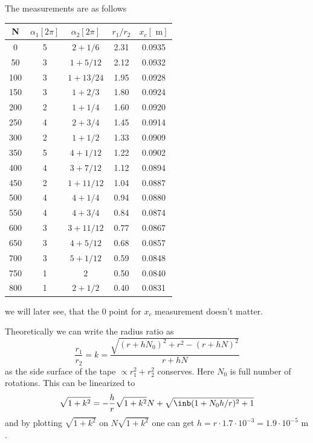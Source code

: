 \newcommand{\inlfrac}[2]{+#1/#2}
The measurements are as follows
\begin{center}
    \begin{tabular}{ c | c | c | c | c}
    N   & $\alpha_1 [2\pi]$ & $\alpha_2 [2\pi]$ & $r_1 / r_2$ & $x_c[\text{ m}]$\\
    \hline
    0   &   5       & $2\inlfrac{1}{6}   $ & 2.31 & 0.0935   \\
    50  &   3       & $1\inlfrac{5}{12}  $ & 2.12 & 0.0932   \\
    100 &   3       & $1\inlfrac{13}{24} $ & 1.95 & 0.0928   \\
    150 &   3       & $1\inlfrac{2}{3}   $ & 1.80 & 0.0924   \\
    200 &   2       & $1\inlfrac{1}{4}   $ & 1.60 & 0.0920   \\
    250 &   4       & $2\inlfrac{3}{4}   $ & 1.45 & 0.0914   \\
    300 &   2       & $1\inlfrac{1}{2}   $ & 1.33 & 0.0909   \\
    350 &   5       & $4\inlfrac{1}{12}  $ & 1.22 & 0.0902   \\
    400 &   4       & $3\inlfrac{7}{12}  $ & 1.12 & 0.0894   \\
    450 &   2       & $1\inlfrac{11}{12} $ & 1.04 & 0.0887   \\
    500 &   4       & $4\inlfrac{1}{4}   $ & 0.94 & 0.0880   \\
    550 &   4       & $4\inlfrac{3}{4}   $ & 0.84 & 0.0874   \\
    600 &   3       & $3\inlfrac{11}{12} $ & 0.77 & 0.0867   \\
    650 &   3       & $4\inlfrac{5}{12}  $ & 0.68 & 0.0857   \\
    700 &   3       & $5\inlfrac{1}{12}  $ & 0.59 & 0.0848   \\
    750 &   1       & $2               $ & 0.50 & 0.0840   \\
    800 &   1       & $2\inlfrac{1}{2}   $ & 0.40 & 0.0831   
    \end{tabular}
\end{center}
we will later see,
that the $0$ point for $x_c$ measurement doesn't matter.

Theoretically we can write the radius ratio as
\begin{equation}
    \frac{r_1}{r_2} = k = \frac{\sqrt{(r + h N_0)^2 + r^2 - (r + h N)^2}}{r + h N}
\end{equation}
as the side surface of the tape $\propto r_1^2 + r_2^2$ conserves.
Here $N_0$ is full number of rotations.
This can be linearized to
\begin{equation}
    \sqrt{1+k^2} = -\frac{h}{r} \sqrt{1+k^2} N + \sqrt{\inb({1+ N_0 h / r})^2 + 1}
\end{equation}
and by plotting $\sqrt{1+k^2}$ on $N \sqrt{1+k^2}$  one can get
$h = r \cdot 1.7\cdot10^{-3} = 1.9 \cdot 10^{-5} \text{ m}$.

